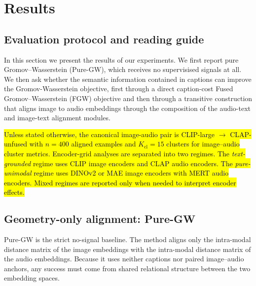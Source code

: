 %
\chapter{Results}
\label{ch:results}

\section{Evaluation protocol and reading guide}
\label{sec:results-protocol}
In this section we present the results of our experiments.
We first report  pure Gromov--Wasserstein (Pure-GW), which receives no supervisised signals at all. We then ask whether the semantic information contained in captions can improve the Gromov-Wasserstein objective, first through a direct caption-cost Fused Gromov--Wasserstein (FGW) objective and then through a transitive construction that aligns image to audio embeddings through the composition of the audio-text and image-text alignment modules. 

\hl{Unless stated otherwise, the canonical image-audio pair is CLIP-large $\rightarrow$ CLAP-unfused with $n=400$ aligned examples and $K_{\mathrm{cl}}=15$ clusters for image--audio cluster metrics. Encoder-grid analyses are separated into two regimes. The \emph{text-grounded} regime uses CLIP image encoders and CLAP audio encoders. The \emph{pure-unimodal} regime uses DINOv2 or MAE image encoders with MERT audio encoders. Mixed regimes are reported only when needed to interpret encoder effects.}

\section{Geometry-only alignment: Pure-GW}
\label{sec:results-puregw}

Pure-GW is the strict no-signal baseline. The method aligns only the intra-modal distance matrix of the image embeddings with the intra-modal distance matrix of the audio embeddings. Because it uses neither captions nor paired image--audio anchors, any success must come from shared relational structure between the two embedding spaces.

